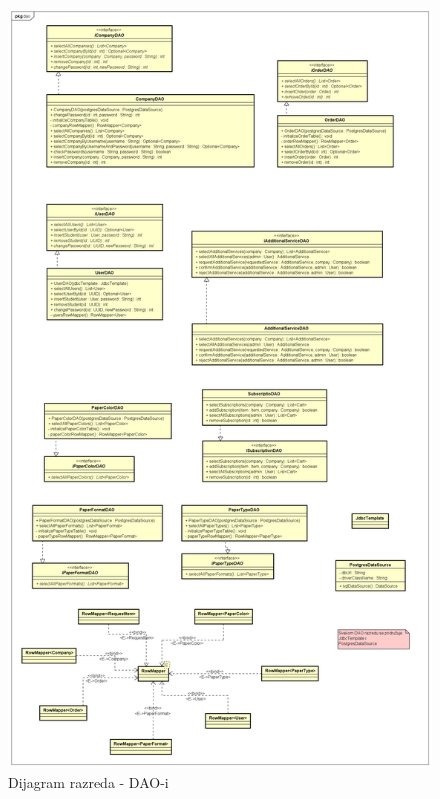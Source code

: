 			\begin{figure}[H]
				\includegraphics[scale=0.29]{dijagrami/dij_raz_dao_ureden.PNG} 
				\centering
				\caption{Dijagram razreda - DAO-i}
				\label{fig:dij_raz3}%
			\end{figure}
		
